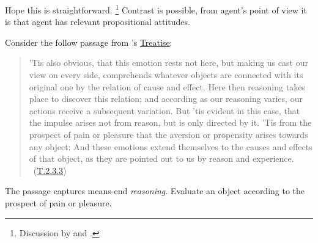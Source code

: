 \begin{note}
  Hope this is straightforward.%
  \footnote{
    Discussion by \citeauthor{Collins:1997wn} and \citeauthor{Dancy:2000aa}.
  }
  Contrast is possible, from agent's point of view it is that agent has relevant propositional attitudes.

  Consider the follow passage from \citeauthor{Hume:2011aa}'s \hyperlink{cite.Hume:2011aa}{Treatise}:

  \begin{quote}
    'Tis also obvious, that this emotion rests not here, but making us cast our view on every side, comprehends whatever objects are connected with its original one by the relation of cause and effect.
    Here then reasoning takes place to discover this relation; and according as our reasoning varies, our actions receive a subsequent variation.
    But 'tis evident in this case, that the impulse arises not from reason, but is only directed by it.
    'Tis from the prospect of pain or pleasure that the aversion or propensity arises towards any object: And these emotions extend themselves to the causes and effects of that object, as they are pointed out to us by reason and experience.%
    \mbox{ }\hfill\mbox{(\hyperlink{cite.Hume:2011aa}{T.2.3.3})}
  \end{quote}

  The passage captures means-end \emph{reasoning}.
  Evaluate an object according to the prospect of pain or pleasure.
\end{note}

